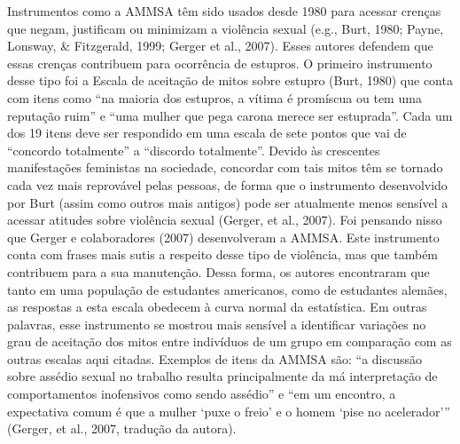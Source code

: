 Instrumentos como a AMMSA têm sido usados desde 1980 para acessar crenças que negam, justificam ou minimizam a violência sexual (e.g., Burt, 1980; Payne, Lonsway, \& Fitzgerald, 1999; Gerger et al., 2007). Esses autores defendem que essas crenças contribuem para ocorrência de estupros. O primeiro instrumento desse tipo foi a Escala de aceitação de mitos sobre estupro (Burt, 1980) que conta com itens como ``na maioria dos estupros, a vítima é promíscua ou tem uma reputação ruim'' e ``uma mulher que pega carona merece ser estuprada''. Cada um dos 19 itens deve ser respondido em uma escala de sete pontos que vai de ``concordo totalmente'' a ``discordo totalmente''. Devido às crescentes manifestações feministas na sociedade, concordar com tais mitos têm se tornado cada vez mais reprovável pelas pessoas, de forma que o instrumento desenvolvido por Burt (assim como outros mais antigos) pode ser atualmente menos sensível a acessar atitudes sobre violência sexual (Gerger, et al., 2007). Foi pensando nisso que Gerger e colaboradores (2007) desenvolveram a AMMSA. Este instrumento conta com frases mais sutis a respeito desse tipo de violência, mas que também contribuem para a sua manutenção. Dessa forma, os autores encontraram que tanto em uma população de estudantes americanos, como de estudantes alemães, as respostas a esta escala obedecem à curva normal da estatística. Em outras palavras, esse instrumento se mostrou mais sensível a identificar variações no grau de aceitação dos mitos entre indivíduos de um grupo em comparação com as outras escalas aqui citadas. Exemplos de itens da AMMSA são: ``a discussão sobre assédio sexual no trabalho resulta principalmente da má interpretação de comportamentos inofensivos como sendo assédio'' e ``em um encontro, a expectativa comum é que a mulher ‘puxe o freio’ e o homem ‘pise no acelerador’'' (Gerger, et al., 2007, tradução da autora).

